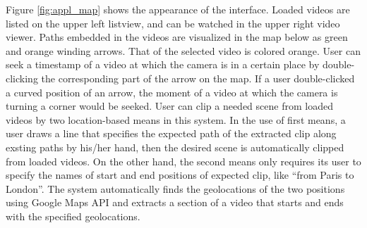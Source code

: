 Figure \ref{fig:appl_map} shows the appearance of the interface.
Loaded videos are listed on the upper left listview, and can be watched in the upper right video viewer.
Paths embedded in the videos are visualized in the map below as green and orange winding arrows. That of the selected video is colored orange.
User can seek a timestamp of a video at which the camera is in a certain place by double-clicking the corresponding part of the arrow on the map.
If a user double-clicked a curved position of an arrow, the moment of a video at which the camera is turning a corner would be seeked.
User can clip a needed scene from loaded videos by two location-based means in this system.
In the use of first means, a user draws a line that specifies the expected path of the extracted clip along exsting paths by his/her hand, then the desired scene is automatically clipped from loaded videos.
On the other hand, the second means only requires its user to specify the names of start and end positions of expected clip, like ``from Paris to London''.
The system automatically finds the geolocations of the two positions using Google Maps API \cite{googlemapsapi} and extracts a section of a video that starts and ends with the specified geolocations.
